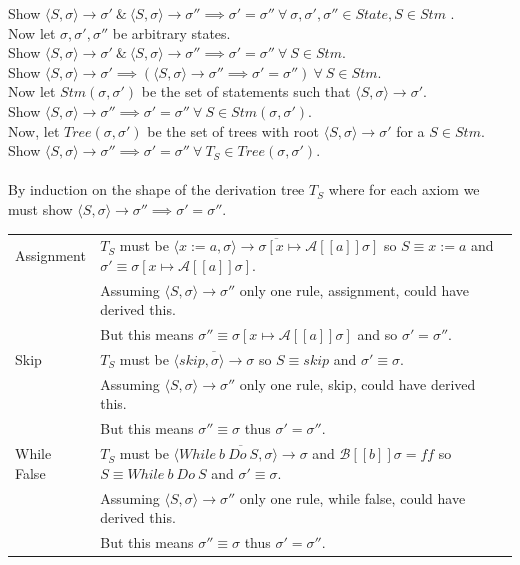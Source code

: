 \documentclass[11pt,a4paper]{article}
\begin{document}
Show $\langle S,\sigma\rangle\to\sigma'\ \&\ \langle S,\sigma\rangle\to\sigma''\implies\sigma'=\sigma''\ \forall\ \sigma,\sigma',\sigma''\in State, S\in Stm$ .\\
Now let $\sigma,\sigma',\sigma''$ be arbitrary states.\\
Show $\langle S,\sigma\rangle\to\sigma'\ \&\ \langle S,\sigma\rangle\to\sigma''\implies\sigma'=\sigma''\ \forall\ S\in Stm$.\\
Show $\langle S,\sigma\rangle\to\sigma'\implies(\langle S,\sigma\rangle\to\sigma''\implies\sigma'=\sigma'')\ \forall\ S\in Stm$.\\
Now let $Stm(\sigma,\sigma')$ be the set of statements such that $\langle S,\sigma\rangle\to\sigma'$.\\
Show $\langle S,\sigma\rangle\to\sigma''\implies\sigma'=\sigma''\ \forall\ S\in Stm(\sigma,\sigma')$.\\
Now, let $Tree(\sigma,\sigma')$ be the set of trees with root $\langle S,\sigma\rangle\to\sigma'$ for a $S\in Stm$.\\
Show $\langle S,\sigma\rangle\to\sigma''\implies\sigma'=\sigma''\ \forall\ T_S\in Tree(\sigma,\sigma')$.\\
\\
By induction on the shape of the derivation tree $T_S$ where for each axiom we must show $\langle S,\sigma\rangle\to\sigma''\implies\sigma'=\sigma''$.\\
\begin{tabular}{ll}
Assignment&$T_S$ must be $\overline{\langle x:=a,\sigma\rangle\to\sigma[x\mapsto\mathcal{A}[[a]]\sigma]}$ so $S\equiv x:=a$ and $\sigma'\equiv\sigma[x\mapsto\mathcal{A}[[a]]\sigma]$.\\
&Assuming $\langle S,\sigma\rangle\to\sigma''$ only one rule, assignment, could have derived this.\\
&But this means $\sigma''\equiv\sigma[x\mapsto\mathcal{A}[[a]]\sigma]$ and so $\sigma'=\sigma''$.\\
Skip&$T_S$ must be $\overline{\langle skip,\sigma\rangle\to\sigma}$ so $S\equiv skip$ and $\sigma'\equiv\sigma$.\\
&Assuming $\langle S,\sigma\rangle\to\sigma''$ only one rule, skip, could have derived this.\\
&But this means $\sigma''\equiv\sigma$ thus $\sigma'=\sigma''$.\\
While False&$T_S$ must be $\overline{\langle While\ b\ Do\ S,\sigma\rangle\to\sigma}$ and $\mathcal{B}[[b]]\sigma=ff$ so $S\equiv While\ b\ Do\ S$ and $\sigma'\equiv\sigma$.\\
&Assuming $\langle S,\sigma\rangle\to\sigma''$ only one rule, while false, could have derived this.\\
&But this means $\sigma''\equiv\sigma$ thus $\sigma'=\sigma''$.
\end{tabular}
\end{document}
